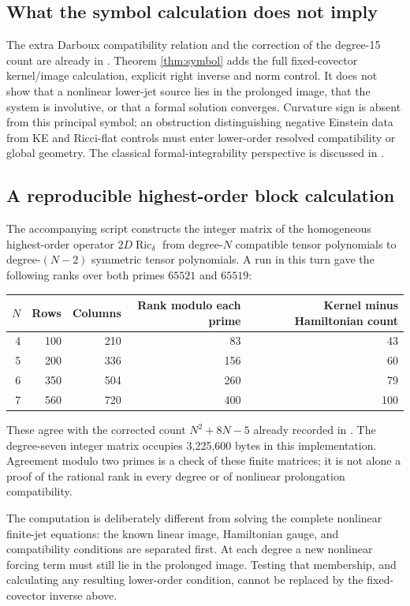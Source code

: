 \documentclass[11pt,a4paper]{article}
\numberwithin{equation}{section}
\theoremstyle{definition}\newtheorem{hypothesis}[theorem]{Input}
\theoremstyle{remark}\newtheorem{remark}[theorem]{Remark}
\newcommand{\Ric}{\operatorname{Ric}}
\begin{document}
\subsection{What the symbol calculation does not imply}
The extra Darboux compatibility relation and the correction of the degree-15
count are already in \cite[A01.55]{Companion}.  Theorem \ref{thm:symbol}
adds the full fixed-covector kernel/image calculation, explicit right
inverse and norm control.  It does not show that a nonlinear lower-jet
source lies in the prolonged image, that the system is involutive, or that
a formal solution converges.  Curvature sign is absent from this principal
symbol; an obstruction distinguishing negative Einstein data from KE and
Ricci-flat controls must enter lower-order resolved compatibility or global
geometry.  The classical formal-integrability perspective is discussed in
\cite[Section 4]{ADsurvey}.


\subsection{A reproducible highest-order block calculation}

The accompanying script constructs the integer matrix of the homogeneous
highest-order operator $2D\Ric_\delta$ from degree-$N$ compatible tensor
polynomials to degree-$(N-2)$ symmetric tensor polynomials.  A run in this
turn gave the following ranks over both primes $65521$ and $65519$:
\begin{center}
\begin{tabular}{rrrrr}
\toprule
$N$ & Rows & Columns & Rank modulo each prime & Kernel minus Hamiltonian count\\
\midrule
4 &100&210&83&43\\
5 &200&336&156&60\\
6 &350&504&260&79\\
7 &560&720&400&100\\
\bottomrule
\end{tabular}
\end{center}
These agree with the corrected count $N^2+8N-5$ already recorded in
\cite[A01.55]{Companion}.  The degree-seven integer matrix occupies
3,225,600 bytes in this implementation.  Agreement modulo two primes is a
check of these finite matrices; it is not alone a proof of the rational
rank in every degree or of nonlinear prolongation compatibility.

The computation is deliberately different from solving the complete
nonlinear finite-jet equations: the known linear image, Hamiltonian gauge,
and compatibility conditions are separated first.  At each degree a new
nonlinear forcing term must still lie in the prolonged image.  Testing that
membership, and calculating any resulting lower-order condition, cannot be
replaced by the fixed-covector inverse above.
\end{document}
